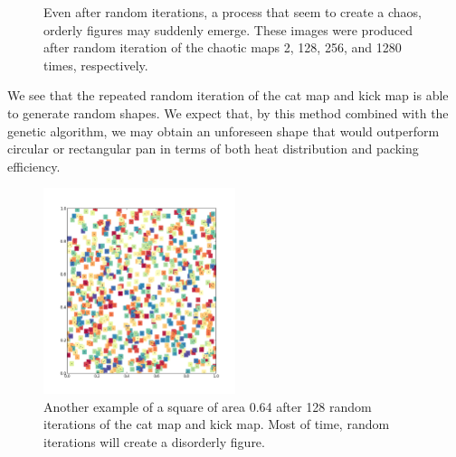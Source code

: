 \documentclass[12pt]{reedmcm}
\begin{document}
\begin{figure}[h!]
  \caption{Even after random iterations, a process that seem to create a chaos, orderly figures may suddenly emerge.
  These images were produced after random iteration of the chaotic maps 2, 128, 256, and 1280 times, respectively.}
  \label{fig:order}
\end{figure}
%
We see that the repeated random iteration of the cat map and kick map is able to generate random shapes.
We expect that, by this method combined with the genetic algorithm, we may obtain an unforeseen shape that would outperform circular or rectangular pan in terms of both heat distribution and packing efficiency.
\begin{figure}[h!]
  \centering
  \includegraphics[width=0.5\textwidth]{chaotic_shape}
  \caption{Another example of a square of area 0.64 after 128 random iterations of the cat map and kick map.
  Most of time, random iterations will create a disorderly figure.
  }
  \label{fig:chaotic}
\end{figure}
\end{document}
